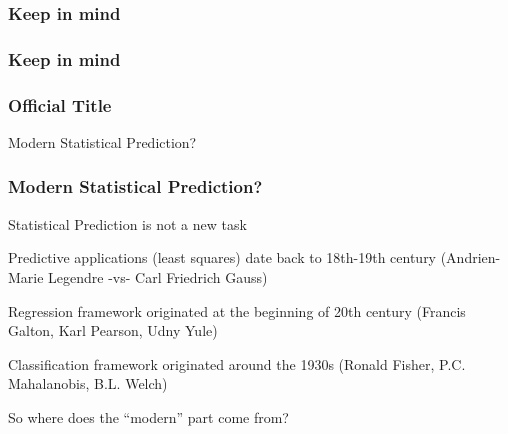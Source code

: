 \documentclass[12pt]{beamer}\usepackage[]{graphicx}\usepackage[]{color}
\begin{document}

\begin{frame}
\frametitle{Keep in mind}
\begin{center}
\end{center}
\end{frame}


\begin{frame}
\frametitle{Keep in mind}
\begin{center}
\end{center}
\end{frame}


\begin{frame}
\frametitle{Official Title}
\begin{center}
\Huge{\hilit Modern Statistical Prediction?}
\end{center}
\end{frame}


\begin{frame}
\frametitle{Modern Statistical Prediction?}

\bbi
  \item Statistical Prediction is not a new task
  \item Predictive applications (least squares) date back to 18th-19th century 
  (Andrien-Marie Legendre -vs- Carl Friedrich Gauss)
  \item Regression framework originated at the beginning of 20th century
  (Francis Galton, Karl Pearson, Udny Yule)
  \item Classification framework originated around the 1930s
  (Ronald Fisher, P.C. Mahalanobis, B.L. Welch)
\ei

\end{frame}


\begin{frame}
\begin{center}
{\large \mdlit So where does the ``modern'' part come from?}
\end{center}
\end{frame}

\end{document}
